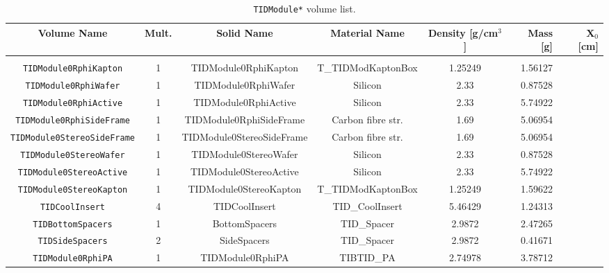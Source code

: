 \documentclass{cmspaper}
\begin{document}
\begin{sidewaystable}[p]
  \caption{{\tt TIDModule*} volume list.}
  \label{tab:tid_module}
  \begin{center}
    \begin{tabular}{cccccrr}
         Volume Name                   & Mult. & Solid Name                    & Material Name         & Density [g/cm$^3$]    & Mass [g] & X$_0$ [cm]     \\ 
	 \hline \\
         {\tt TIDModule0RphiKapton}         & 1     & TIDModule0RphiKapton          & T\_TIDModKaptonBox    & 1.25249       & 1.56127   &   \\
         {\tt TIDModule0RphiWafer}          & 1     & TIDModule0RphiWafer           & Silicon               & 2.33          & 0.87528   &   \\
         {\tt TIDModule0RphiActive}         & 1     & TIDModule0RphiActive          & Silicon               & 2.33          & 5.74922   &   \\
         {\tt TIDModule0RphiSideFrame}      & 1     & TIDModule0RphiSideFrame       & Carbon fibre str.     & 1.69          & 5.06954   &   \\
         {\tt TIDModule0StereoSideFrame}    & 1     & TIDModule0StereoSideFrame     & Carbon fibre str.     & 1.69          & 5.06954   &   \\
         {\tt TIDModule0StereoWafer}        & 1     & TIDModule0StereoWafer         & Silicon               & 2.33          & 0.87528   &   \\
         {\tt TIDModule0StereoActive}       & 1     & TIDModule0StereoActive        & Silicon               & 2.33          & 5.74922   &   \\
         {\tt TIDModule0StereoKapton}       & 1     & TIDModule0StereoKapton        & T\_TIDModKaptonBox    & 1.25249       & 1.59622   &   \\ 
         {\tt TIDCoolInsert}                & 4     & TIDCoolInsert                 & TID\_CoolInsert       & 5.46429       & 1.24313   &   \\
         {\tt TIDBottomSpacers}             & 1     & BottomSpacers                 & TID\_Spacer           & 2.9872        & 2.47265   &   \\
         {\tt TIDSideSpacers}               & 2     & SideSpacers                   & TID\_Spacer           & 2.9872        & 0.41671   &   \\
         {\tt TIDModule0RphiPA}             & 1     & TIDModule0RphiPA              & TIBTID\_PA            & 2.74978       & 3.78712   &   \\

\end{tabular}
\end{center}
\end{sidewaystable}
\end{document}
